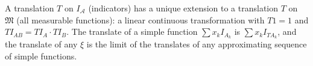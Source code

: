 A translation $T$ on $I_{\mathcal{A}}$ (indicators) has a unique extension to a translation $T$ on $\mathfrak{M}$ (all measurable functions): a linear continuous transformation with $T1 = 1$ and $T I_{AB} = T I_A \cdot T I_B$. The translate of a simple function $\sum x_k I_{A_k}$ is $\sum x_k I_{TA_k}$, and the translate of any $\xi$ is the limit of the translates of any approximating sequence of simple functions.
